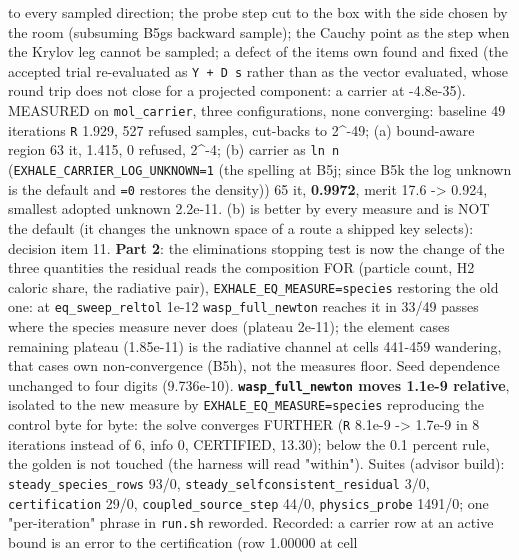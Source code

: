 \documentclass[english,a4paper]{my_memo}
\begin{document}
\begin{itemize}
  to every sampled direction; the probe step cut to the box with the side
  chosen by the room (subsuming B5g\textquotesingle s backward sample); the Cauchy point as
  the step when the Krylov leg cannot be sampled; a defect of the item\textquotesingle s
  own found and fixed (the accepted trial re-evaluated as \texttt{Y\ +\ D\ s} rather
  than as the vector evaluated, whose round trip does not close for a
  projected component: a carrier at -4.8e-35). MEASURED on \texttt{mol\_carrier},
  three configurations, none converging: baseline 49 iterations \texttt{\textbar{}\textbar{}R\textbar{}\textbar{}} 1.929, 527
  refused samples, cut-backs to 2\^{}-49; (a) bound-aware region 63 it, 1.415,
  0 refused, 2\^{}-4; (b) carrier as \texttt{ln\ n} (\texttt{EXHALE\_CARRIER\_LOG\_UNKNOWN=1} (the spelling at B5j; since B5k the log unknown is the default and \texttt{=0} restores the density))
  65 it, \textbf{0.9972}, merit 17.6 -\textgreater{} 0.924, smallest adopted unknown 2.2e-11.
  (b) is better by every measure and is NOT the default (it changes the
  unknown space of a route a shipped key selects): decision item 11. \textbf{Part
  2}: the elimination\textquotesingle s stopping test is now the change of the three
  quantities the residual reads the composition FOR (particle count, H2
  caloric share, the radiative pair), \texttt{EXHALE\_EQ\_MEASURE=species} restoring
  the old one: at \texttt{eq\_sweep\_reltol} 1e-12 \texttt{wasp\_full\_newton} reaches it in
  33/49 passes where the species measure never does (plateau 2e-11); the
  element case\textquotesingle s remaining plateau (1.85e-11) is the radiative channel at
  cells 441-459 wandering, that case\textquotesingle s own non-convergence (B5h), not the
  measure\textquotesingle s floor. Seed dependence unchanged to four digits (9.736e-10).
  \textbf{\texttt{wasp\_full\_newton} moves 1.1e-9 relative}, isolated to the new measure
  by \texttt{EXHALE\_EQ\_MEASURE=species} reproducing the control byte for byte: the
  solve converges FURTHER (\texttt{\textbar{}\textbar{}R\textbar{}\textbar{}} 8.1e-9 -\textgreater{} 1.7e-9 in 8 iterations instead
  of 6, info 0, CERTIFIED, 13.30); below the 0.1 percent rule, the golden
  is not touched (the harness will read "within"). Suites (advisor build):
  \texttt{steady\_species\_rows} 93/0, \texttt{steady\_selfconsistent\_residual} 3/0,
  \texttt{certification} 29/0, \texttt{coupled\_source\_step} 44/0, \texttt{physics\_probe} 1491/0;
  one "per-iteration" phrase in \texttt{run.sh} reworded. Recorded: a carrier row
  at an active bound is an error to the certification (row 1.00000 at cell

\end{itemize}
\end{document}

